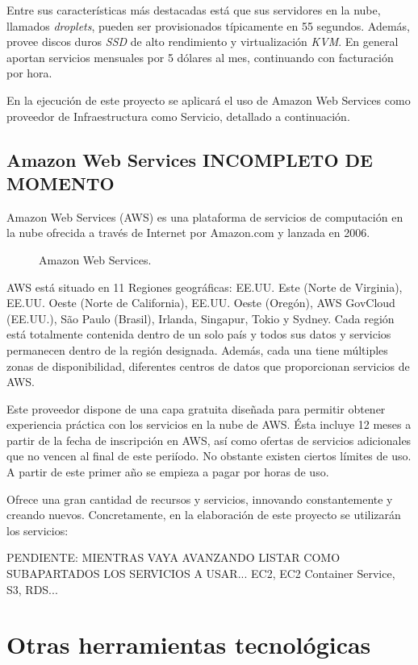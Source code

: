Entre sus características más destacadas está que sus servidores en la nube, llamados \textit{droplets}, pueden ser provisionados típicamente en 55 segundos. Además, provee discos duros \textit{SSD} de alto rendimiento y virtualización \textit{KVM}. En general aportan servicios mensuales por 5 dólares al mes, continuando con facturación por hora.

En la ejecución de este proyecto se aplicará el uso de Amazon Web Services como proveedor de Infraestructura como Servicio, detallado a continuación.

\subsection{Amazon Web Services INCOMPLETO DE MOMENTO}

Amazon Web Services (AWS) es una plataforma de servicios de computación en la nube ofrecida a través de Internet por Amazon.com y lanzada en 2006.

\begin{figure}[H]
\caption{Amazon Web Services.\label{fig:figure_placement_example}}
\end{figure}

AWS está situado en 11 Regiones geográficas: EE.UU. Este (Norte de Virginia), EE.UU. Oeste (Norte de California), EE.UU. Oeste (Oregón), AWS GovCloud (EE.UU.), São Paulo (Brasil), Irlanda, Singapur, Tokio y Sydney. Cada región está totalmente contenida dentro de un solo país y todos sus datos y servicios permanecen dentro de la región designada. Además, cada una tiene múltiples zonas de disponibilidad, diferentes centros de datos que proporcionan servicios de AWS.

Este proveedor dispone de una capa gratuita diseñada para permitir obtener experiencia práctica con los servicios en la nube de AWS. Ésta incluye 12 meses a partir de la fecha de inscripción en AWS, así como ofertas de servicios adicionales que no vencen al final de este periíodo. No obstante existen ciertos límites de uso. A partir de este primer año se empieza a pagar por horas de uso.

Ofrece una gran cantidad de recursos y servicios, innovando constantemente y creando nuevos. Concretamente, en la elaboración de este proyecto se utilizarán los servicios:

PENDIENTE: MIENTRAS VAYA AVANZANDO LISTAR COMO SUBAPARTADOS LOS SERVICIOS A USAR... EC2, EC2 Container Service, S3, RDS...

\section{Otras herramientas tecnológicas}

